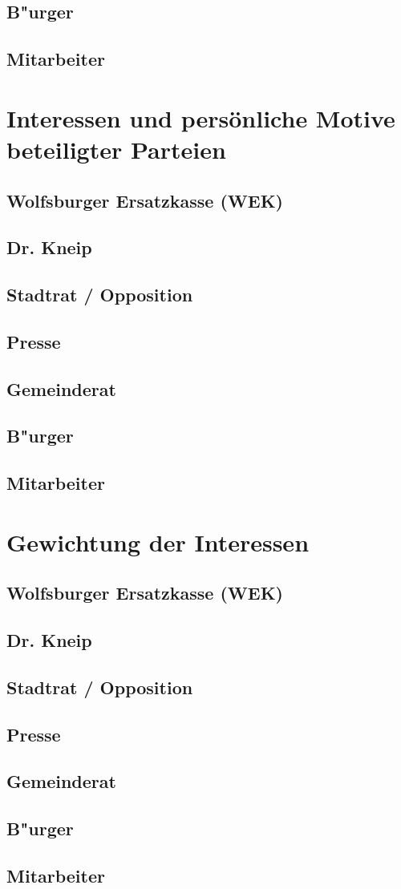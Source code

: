\subsection{B"urger}
\subsection{Mitarbeiter}

\section{Interessen und persönliche Motive beteiligter Parteien}
\subsection{Wolfsburger Ersatzkasse (WEK)}
\subsection{Dr. Kneip}
\subsection{Stadtrat / Opposition}
\subsection{Presse}
\subsection{Gemeinderat}
\subsection{B"urger}
\subsection{Mitarbeiter}

\section{Gewichtung der Interessen}
\subsection{Wolfsburger Ersatzkasse (WEK)}
\subsection{Dr. Kneip}
\subsection{Stadtrat / Opposition}
\subsection{Presse}
\subsection{Gemeinderat}
\subsection{B"urger}
\subsection{Mitarbeiter}
